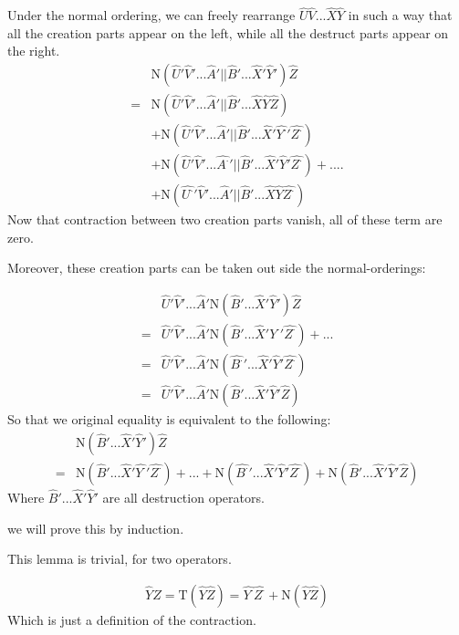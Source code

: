 Under the normal ordering, we can freely rearrange $\hat{U}\hat{V}...\hat{X}\hat{Y}$ in such a way that all the creation parts appear on the left, while all the destruct parts appear on the right.
\begin{align}
&\mathrm{N}(\hat{U}'\hat{V}'...\hat{A}'||\hat{B}'...\hat{X}'\hat{Y}')\hat{Z} \nonumber \\
=&\mathrm{N}(\hat{U}'\hat{V}'...\hat{A}'||\hat{B}'...\hat{X}\hat{Y}\hat{Z})\nonumber \\
&+\mathrm{N}(\hat{U}'\hat{V}'...\hat{A}'||\hat{B}'...\hat{X}'\hat{Y^{\cdot}}'\hat{Z^{\cdot}})\nonumber \\
&+\mathrm{N}(\hat{U}'\hat{V}'...\hat{A^{\cdot}}'||\hat{B}'...\hat{X}'\hat{Y}'\hat{Z^{\cdot}})+....\nonumber \\
&+\mathrm{N}(\hat{U^{\cdot}}'\hat{V}'...\hat{A}'||\hat{B}'...\hat{X}\hat{Y}\hat{Z^{\cdot}})\nonumber
\end{align}
Now that contraction between two creation parts vanish, all of these term are zero.

Moreover, these creation parts can be taken out side the normal-orderings:

\begin{align}
&\hat{U}'\hat{V}'...\hat{A}'\mathrm{N}(\hat{B}'...\hat{X}'\hat{Y}') \hat{Z} \nonumber \\
=&\hat{U}'\hat{V}'...\hat{A}'\mathrm{N}(\hat{B}'...\hat{X}'\hat{Y^{\cdot}}'\hat{Z^{\cdot}}) + ... \nonumber \\
=&\hat{U}'\hat{V}'...\hat{A}'\mathrm{N}(\hat{B^{\cdot}}'...\hat{X}'\hat{Y}'\hat{Z^{\cdot}})  \nonumber \\
=&\hat{U}'\hat{V}'...\hat{A}'\mathrm{N}(\hat{B}'...\hat{X}'\hat{Y}'\hat{Z}) \nonumber
\end{align}
So that we original equality is equivalent to the following:
\begin{align}
&\mathrm{N}(\hat{B}'...\hat{X}'\hat{Y}') \hat{Z}  \nonumber \\
=&\mathrm{N}(\hat{B}'...\hat{X}'\hat{Y^{\cdot}}'\hat{Z^{\cdot}}) + ...+\mathrm{N}(\hat{B^{\cdot}}'...\hat{X}'\hat{Y}'\hat{Z^{\cdot}})+ \mathrm{N}(\hat{B}'...\hat{X}'\hat{Y}'\hat{Z}) \nonumber
\end{align}
Where $\hat{B}'...\hat{X}'\hat{Y}'$ are all destruction operators.

we will prove this by induction.

This lemma is trivial, for two operators.

\begin{align}
\hat{Y}\hat{Z}=\mathrm{T}(\hat{Y}\hat{Z})=\hat{Y^{\cdot}}\hat{Z^{\cdot}} +\mathrm{N}(\hat{Y}\hat{Z})
\nonumber
\end{align}
Which is just a definition of the contraction.

